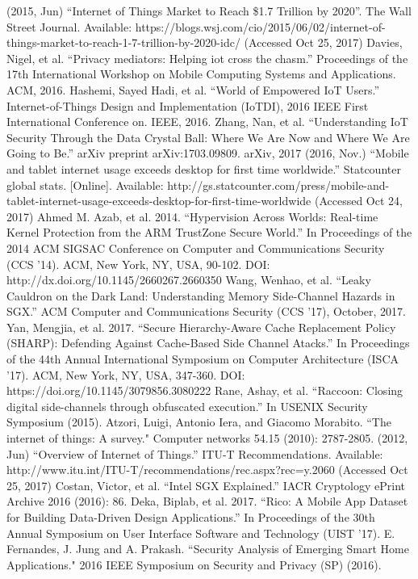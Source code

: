  (2015, Jun) ``Internet of Things Market to Reach \$1.7 Trillion by 2020''. The Wall Street Journal. Available: https://blogs.wsj.com/cio/2015/06/02/internet-of-things-market-to-reach-1-7-trillion-by-2020-idc/ (Accessed Oct 25, 2017)
 Davies, Nigel, et al. ``Privacy mediators: Helping iot cross the chasm.'' Proceedings of the 17th International Workshop on Mobile Computing Systems and Applications. ACM, 2016.
 Hashemi, Sayed Hadi, et al. ``World of Empowered IoT Users.'' Internet-of-Things Design and Implementation (IoTDI), 2016 IEEE First International Conference on. IEEE, 2016.
 Zhang, Nan, et al. ``Understanding IoT Security Through the Data Crystal Ball: Where We Are Now and Where We Are Going to Be.'' arXiv preprint arXiv:1703.09809. arXiv, 2017
 (2016, Nov.) ``Mobile and tablet internet usage exceeds desktop for first time worldwide.'' Statcounter global stats. [Online]. Available: http://gs.statcounter.com/press/mobile-and-tablet-internet-usage-exceeds-desktop-for-first-time-worldwide (Accessed Oct 24, 2017)
 Ahmed M. Azab, et al. 2014. ``Hypervision Across Worlds: Real-time Kernel Protection from the ARM TrustZone Secure World.'' In Proceedings of the 2014 ACM SIGSAC Conference on Computer and Communications Security (CCS '14). ACM, New York, NY, USA, 90-102. DOI: http://dx.doi.org/10.1145/2660267.2660350
 Wang, Wenhao, et al. ``Leaky Cauldron on the Dark Land: Understanding Memory Side-Channel Hazards in SGX.'' ACM Computer and Communications Security (CCS ’17), October, 2017.
 Yan, Mengjia, et al. 2017. ``Secure Hierarchy-Aware Cache Replacement Policy (SHARP): Defending Against Cache-Based Side Channel Atacks.'' In Proceedings of the 44th Annual International Symposium on Computer Architecture (ISCA '17). ACM, New York, NY, USA, 347-360. DOI: https://doi.org/10.1145/3079856.3080222
 Rane, Ashay, et al. ``Raccoon: Closing digital side-channels through obfuscated execution.'' In USENIX Security Symposium (2015).
 Atzori, Luigi, Antonio Iera, and Giacomo Morabito. ``The internet of things: A survey." Computer networks 54.15 (2010): 2787-2805.
 (2012, Jun) ``Overview of Internet of Things.'' ITU-T Recommendations. Available: http://www.itu.int/ITU-T/recommendations/rec.aspx?rec=y.2060 (Accessed Oct 25, 2017)
 Costan, Victor, et al. ``Intel SGX Explained.'' IACR Cryptology ePrint Archive 2016 (2016): 86.
 Deka, Biplab, et al. 2017. ``Rico: A Mobile App Dataset for Building Data-Driven Design Applications.'' In Proceedings of the 30th Annual Symposium on User Interface Software and Technology (UIST '17).
 E. Fernandes, J. Jung and A. Prakash. ``Security Analysis of Emerging Smart Home Applications." 2016 IEEE Symposium on Security and Privacy (SP) (2016).
